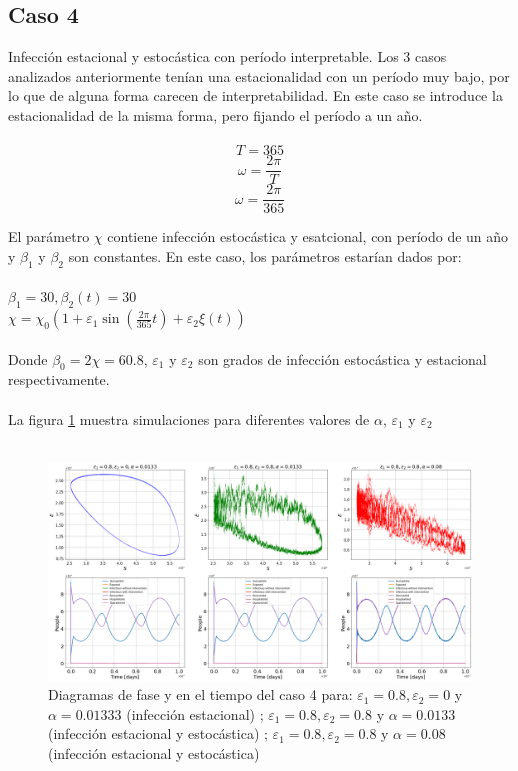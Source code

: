 \documentclass[conference]{IEEEtran}
\begin{document}
\subsection{Caso 4}

Infección estacional y estocástica con período interpretable. Los 3 casos analizados anteriormente tenían 
una estacionalidad con un período muy bajo, por lo que de alguna forma carecen de interpretabilidad. En
este caso se introduce la estacionalidad de la misma forma, pero fijando el período a un año.
\\\\
$$T = 365$$
$$\omega = \frac{2 \pi}{T}$$
$$\omega = \frac{2 \pi}{365}$$


El parámetro $\chi$ contiene infección estocástica y esatcional, con período de un año y $\beta_1$ y $\beta_2$ son constantes. En este caso, los parámetros estarían dados por:
\\\\
$\beta_1 = 30, \beta_2(t) = 30$
\\
$\chi = \chi_0(1 + \varepsilon_1 \sin(\frac{2 \pi}{365} t) + \varepsilon_2 \xi(t))$
\\\\
Donde $\beta_0 = 2\chi = 60.8$, $\varepsilon_1$ y $\varepsilon_2$ son grados de infección estocástica y estacional respectivamente.
\\\\
La figura \ref{case_4} muestra simulaciones para diferentes valores de $\alpha$, $\varepsilon_1$ y $\varepsilon_2$
\\\\
\begin{figure}[h]
    \centering
    \includegraphics[width=18cm]{../Figures/case_4.png}
    \caption{Diagramas de fase y en el tiempo del caso 4 para: $\varepsilon_1 = 0.8, \varepsilon_2 = 0$
    y $\alpha = 0.01333$ (infección estacional) ; $\varepsilon_1 = 0.8, \varepsilon_2 = 0.8$
    y $\alpha = 0.0133$ (infección estacional y estocástica) ; $\varepsilon_1 = 0.8, \varepsilon_2 = 0.8$
    y $\alpha = 0.08$ (infección estacional y estocástica)}
    \label{case_4}
\end{figure}
\end{document}
